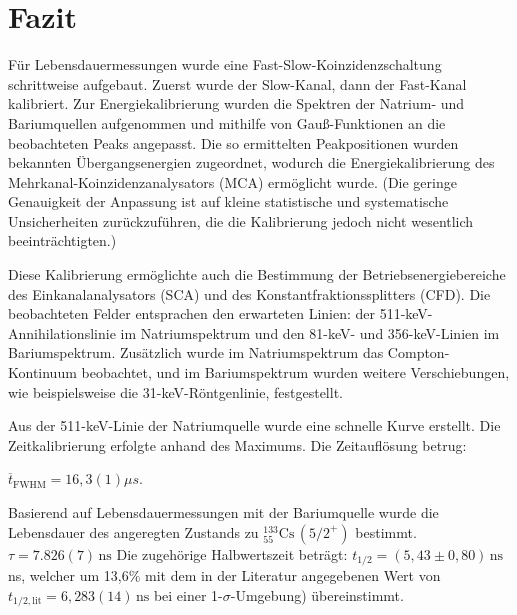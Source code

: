 \section{Fazit}
Für Lebensdauermessungen wurde eine Fast-Slow-Koinzidenzschaltung schrittweise aufgebaut. Zuerst wurde der Slow-Kanal, dann der Fast-Kanal kalibriert. Zur Energiekalibrierung wurden die Spektren der Natrium- und Bariumquellen aufgenommen und mithilfe von Gauß-Funktionen an die beobachteten Peaks angepasst. Die so ermittelten Peakpositionen wurden bekannten Übergangsenergien zugeordnet, wodurch die Energiekalibrierung des Mehrkanal-Koinzidenzanalysators (MCA) ermöglicht wurde. 
(Die geringe Genauigkeit der Anpassung ist auf kleine statistische und systematische Unsicherheiten zurückzuführen, die die Kalibrierung jedoch nicht wesentlich beeinträchtigten.)

Diese Kalibrierung ermöglichte auch die Bestimmung der Betriebsenergiebereiche des Einkanalanalysators (SCA) und des Konstantfraktionssplitters (CFD). Die beobachteten Felder entsprachen den erwarteten Linien: der 511-keV-Annihilationslinie im Natriumspektrum und den 81-keV- und 356-keV-Linien im Bariumspektrum. Zusätzlich wurde im Natriumspektrum das Compton-Kontinuum beobachtet, und im Bariumspektrum wurden weitere Verschiebungen, wie beispielsweise die 31-keV-Röntgenlinie, festgestellt.

Aus der 511-keV-Linie der Natriumquelle wurde eine schnelle Kurve erstellt. Die Zeitkalibrierung erfolgte anhand des Maximums. Die Zeitauflösung betrug:

$\overline{t}_\text{FWHM} = 16,3(1)\mu s.$


Basierend auf Lebensdauermessungen mit der Bariumquelle wurde die Lebensdauer des angeregten Zustands zu $^{133}_{55}\text{Cs}\,(5/2^+)$ bestimmt. $\tau = 7.826(7)\,\mathrm{ns}$
Die zugehörige Halbwertszeit beträgt: $t_{1/2} = (5,43\pm0,80)\,\mathrm{ns}$ ns, welcher um 13,6\% mit dem in der Literatur angegebenen Wert von $t_{1/2,\mathrm{lit}} = 6,283(14)\,\mathrm{ns}$ bei einer 1-$\sigma$-Umgebung) übereinstimmt.